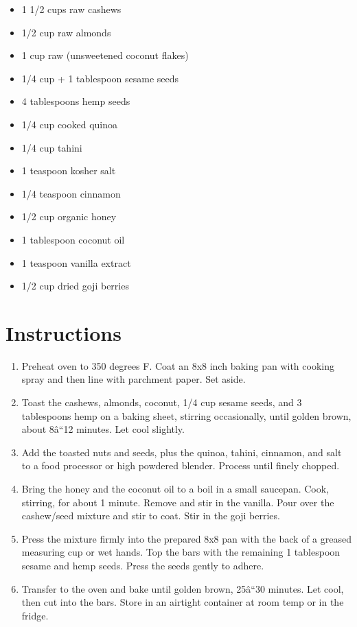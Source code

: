 \documentclass[
  letterpaper,
  DIV=11,
  numbers=noendperiod,
  titlepage=false]{scrreprt}
\providecommand{\tightlist}{%
  \setlength{\itemsep}{0pt}\setlength{\parskip}{0pt}}\usepackage{longtable,booktabs,array}
\begin{document}
\begin{itemize}
\tightlist
\item
  1 1/2 cups raw cashews
\item
  1/2 cup raw almonds
\item
  1 cup raw (unsweetened coconut flakes)
\item
  1/4 cup + 1 tablespoon sesame seeds
\item
  4 tablespoons hemp seeds
\item
  1/4 cup cooked quinoa
\item
  1/4 cup tahini
\item
  1 teaspoon kosher salt
\item
  1/4 teaspoon cinnamon
\item
  1/2 cup organic honey
\item
  1 tablespoon coconut oil
\item
  1 teaspoon vanilla extract
\item
  1/2 cup dried goji berries
\end{itemize}

\section{Instructions}\label{instructions-149}

\begin{enumerate}
\def\labelenumi{\arabic{enumi}.}
\tightlist
\item
  Preheat oven to 350 degrees F. Coat an 8x8 inch baking pan with
  cooking spray and then line with parchment paper. Set aside.
\item
  Toast the cashews, almonds, coconut, 1/4 cup sesame seeds, and 3
  tablespoons hemp on a baking sheet, stirring occasionally, until
  golden brown, about 8â``12 minutes. Let cool slightly.
\item
  Add the toasted nuts and seeds, plus the quinoa, tahini, cinnamon, and
  salt to a food processor or high powdered blender. Process until
  finely chopped.
\item
  Bring the honey and the coconut oil to a boil in a small saucepan.
  Cook, stirring, for about 1 minute. Remove and stir in the vanilla.
  Pour over the cashew/seed mixture and stir to coat. Stir in the goji
  berries.
\item
  Press the mixture firmly into the prepared 8x8 pan with the back of a
  greased measuring cup or wet hands. Top the bars with the remaining 1
  tablespoon sesame and hemp seeds. Press the seeds gently to adhere.
\item
  Transfer to the oven and bake until golden brown, 25â``30 minutes. Let
  cool, then cut into the bars. Store in an airtight container at room
  temp or in the fridge.
\end{enumerate}
\end{document}
